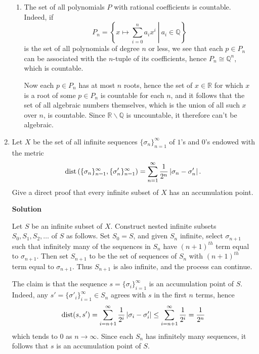 \documentclass{article}
\def\dist{\mathop{\rm dist}\nolimits}
\begin{document}
\begin{enumerate}
\begin{enumerate}
\item The set of all polynomials \(P\) with rational coefficients is countable.  Indeed, if
\[P_n = \left\{ \left. x \mapsto \sum_{i = 0}^n a_i x^i \ \right| \ a_i \in \mathbb{Q} \right\}\]
is the set of all polynomials of degree \(n\) or less, we see that each \(p \in P_n\) can be associated with the \(n\)-tuple of its coefficients, hence \(P_n \cong \mathbb{Q}^n\), which is countable.

Now each \(p \in P_n\) has at most \(n\) roots, hence the set of \(x \in \mathbb{R}\) for which \(x\) is a root of some \(p \in P_n\) is countable for each \(n\), and it follows that the set of all algebraic numbers themselves, which is the union of all such \(x\) over \(n\), is countable.  Since \(\mathbb{R} \backslash \mathbb{Q}\) is uncountable, it therefore can't be algebraic.

\end{enumerate}



\item Let \(X\) be the set of all infinite sequences \(\{\sigma_n\}_{n = 1}^{\infty}\) of \(1\)'s and \(0\)'s endowed with the metric
\[\dist \left( \{\sigma_n\}_{n = 1}^{\infty},
               \{\sigma'_n\}_{n = 1}^{\infty} \right)
  = \sum_{n = 1}^{\infty} \frac{1}{2^n} \left| \sigma_n - \sigma'_n \right|.\]
Give a direct proof that every infinite subset of \(X\) has an accumulation point.

{\bf Solution}

Let \(S\) be an infinite subset of \(X\).  Construct nested infinite subsets \(S_0, S_1, S_2, \ldots\) of \(S\) as follows.  Set \(S_0 = S\), and given \(S_n\) infinite, select \(\sigma_{n + 1}\) such that infinitely many of the sequences in \(S_n\) have \((n + 1)^{th}\) term equal to \(\sigma_{n + 1}\).  Then set \(S_{n + 1}\) to be the set of sequences of \(S_n\) with \((n + 1)^{th}\) term equal to \(\sigma_{n + 1}\).  Thus \(S_{n + 1}\) is also infinite, and the process can continue.

The claim is that the sequence \(s = \{\sigma_i\}_{i = 1}^{\infty}\) is an accumulation point of \(S\).  Indeed, any \(s' = \{\sigma'_i\}_{i = 1}^{\infty} \in S_n\) agrees with \(s\) in the first \(n\) terms, hence
\[\dist(s, s')
     = \sum_{i = n + 1}^{\infty} \frac{1}{2^i} \left| \sigma_i - \sigma'_i \right|
  \leq \sum_{i = n + 1}^{\infty} \frac{1}{2^i}
     = \frac{1}{2^n}\]
which tends to \(0\) as \(n \to \infty\).  Since each \(S_n\) has infinitely many sequences, it follows that \(s\) is an accumulation point of \(S\).




\end{enumerate}
\end{document}
